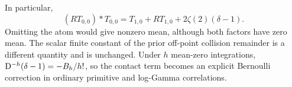 In particular,
\[
 (RT_{0,0})*T_{0,0}=T_{1,0}+RT_{1,0}+2\zeta(2)(\delta-1).
\]
Omitting the atom would give nonzero mean, although both factors have zero
mean. The scalar finite constant of the prior off-point collision remainder
is a different quantity and is unchanged. Under $h$ mean-zero integrations,
$\mathrm D^{-h}(\delta-1)=-B_h/h!$, so the contact term becomes an explicit
Bernoulli correction in ordinary primitive and log-Gamma correlations.

